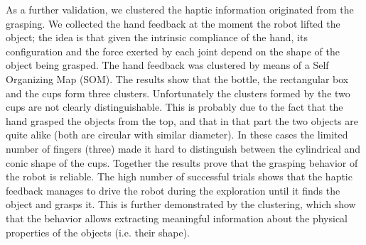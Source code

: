 As a further validation, we clustered the haptic information
originated from the grasping. We collected the hand feedback at
the moment the robot lifted the object; the idea is that given the
intrinsic compliance of the hand, its configuration and the force
exerted by each joint depend on the shape of the object being
grasped. The hand feedback was clustered by means of a Self
Organizing Map (SOM). The results show that the bottle, the
rectangular box and the cups form three clusters. Unfortunately
the clusters formed by the two cups are not clearly
distinguishable. This is probably due to the fact that the hand
grasped the objects from the top, and that in that part the two
objects are quite alike (both are circular with similar diameter).
In these cases the limited number of fingers (three) made it hard
to distinguish between the cylindrical and conic shape of the
cups. Together the results prove that the grasping behavior of the
robot is reliable. The high number of successful trials shows that
the haptic feedback manages to drive the robot during the
exploration until it finds the object and grasps it. This is
further demonstrated by the clustering, which show that the
behavior allows extracting meaningful information about the
physical properties of the objects (i.e. their shape).